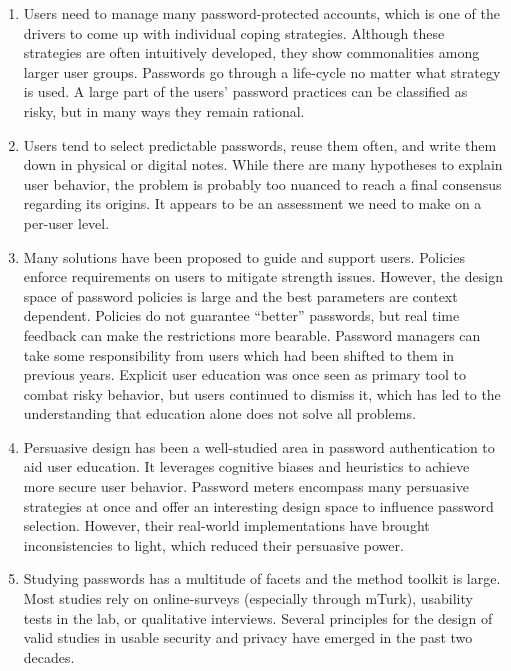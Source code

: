 \begin{enumerate}
	\item Users need to manage many password-protected accounts, which is one of the drivers to come up with individual coping strategies. Although these strategies are often intuitively developed, they show commonalities among larger user groups. Passwords go through a life-cycle no matter what strategy is used. A large part of the users' password practices can be classified as risky, but in many ways they remain rational.
	\item Users tend to select predictable passwords, reuse them often, and write them down in physical or digital notes. While there are many hypotheses to explain user behavior, the problem is probably too nuanced to reach a final consensus regarding its origins. It appears to be an assessment we need to make on a per-user level.
	\item Many solutions have been proposed to guide and support users. Policies enforce requirements on users to mitigate strength issues. However, the design space of password policies is large and the best parameters are context dependent. Policies do not guarantee ``better'' passwords, but real time feedback can make the restrictions more bearable. Password managers can take some responsibility from users which had been shifted to them in previous years. Explicit user education was once seen as primary tool to combat risky behavior, but users continued to dismiss it, which has led to the understanding that education alone does not solve all problems.
	\item Persuasive design has been a well-studied area in password authentication to aid user education. It leverages cognitive biases and heuristics to achieve more secure user behavior. Password meters encompass many persuasive strategies at once and offer an interesting design space to influence password selection. However, their real-world implementations have brought inconsistencies to light, which reduced their persuasive power. 
	\item Studying passwords has a multitude of facets and the method toolkit is large. Most studies rely on online-surveys (especially through \gls{mTurk}), usability tests in the lab, or qualitative interviews. Several principles for the design of valid studies in usable security and privacy have emerged in the past two decades. 
\end{enumerate}

